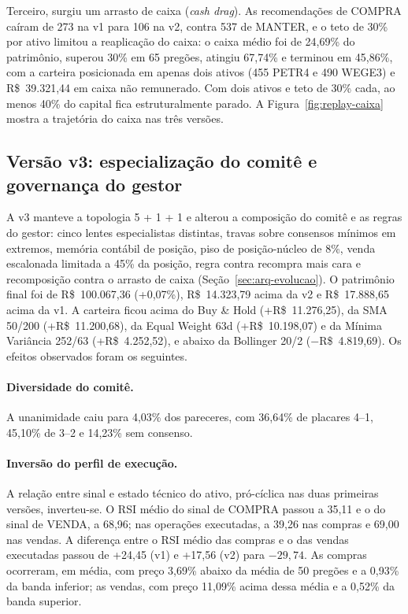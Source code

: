 Terceiro, surgiu um arrasto de caixa (\textit{cash drag}). As recomendações de COMPRA caíram de 273 na v1 para 106 na v2, contra 537 de MANTER, e o teto de 30\% por ativo limitou a reaplicação do caixa: o caixa médio foi de 24,69\% do patrimônio, superou 30\% em 65 pregões, atingiu 67,74\% e terminou em 45,86\%, com a carteira posicionada em apenas dois ativos (455 PETR4 e 490 WEGE3) e R\$~39.321,44 em caixa não remunerado. Com dois ativos e teto de 30\% cada, ao menos 40\% do capital fica estruturalmente parado. A Figura~\ref{fig:replay-caixa} mostra a trajetória do caixa nas três versões.



\subsection{Versão v3: especialização do comitê e governança do gestor}
\label{sec:res-v3}

A v3 manteve a topologia 5 + 1 + 1 e alterou a composição do comitê e as regras do gestor: cinco lentes especialistas distintas, travas sobre consensos mínimos em extremos, memória contábil de posição, piso de posição-núcleo de 8\%, venda escalonada limitada a 45\% da posição, regra contra recompra mais cara e recomposição contra o arrasto de caixa (Seção~\ref{sec:arq-evolucao}). O patrimônio final foi de R\$~100.067,36 (+0,07\%), R\$~14.323,79 acima da v2 e R\$~17.888,65 acima da v1. A carteira ficou acima do Buy \& Hold (+R\$~11.276,25), da SMA 50/200 (+R\$~11.200,68), da Equal Weight 63d (+R\$~10.198,07) e da Mínima Variância 252/63 (+R\$~4.252,52), e abaixo da Bollinger 20/2 ($-$R\$~4.819,69). Os efeitos observados foram os seguintes.

\paragraph*{Diversidade do comitê.} A unanimidade caiu para 4,03\% dos pareceres, com 36,64\% de placares 4--1, 45,10\% de 3--2 e 14,23\% sem consenso.

\paragraph*{Inversão do perfil de execução.} A relação entre sinal e estado técnico do ativo, pró-cíclica nas duas primeiras versões, inverteu-se. O RSI médio do sinal de COMPRA passou a 35,11 e o do sinal de VENDA, a 68,96; nas operações executadas, a 39,26 nas compras e 69,00 nas vendas. A diferença entre o RSI médio das compras e o das vendas executadas passou de +24,45 (v1) e +17,56 (v2) para $-29{,}74$. As compras ocorreram, em média, com preço 3,69\% abaixo da média de 50 pregões e a 0,93\% da banda inferior; as vendas, com preço 11,09\% acima dessa média e a 0,52\% da banda superior.

